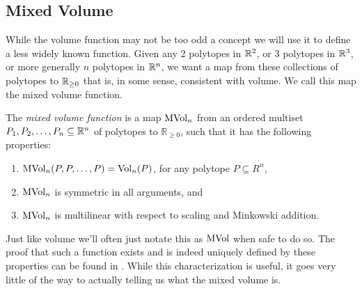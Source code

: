 \documentclass[12pt,oneside]{../../sfsuthesis}
\begin{document}
\subsection{Mixed Volume}
While the volume function may not be too odd a concept we will use it to define a less widely known function.
Given any \( 2 \) polytopes in \( \mathbb{R}^2 \), or \( 3 \) polytopes in \( \mathbb{R}^3 \), or more generally \( n \) polytopes in \( \mathbb{R}^n \), we want a map from these collections of polytopes to \( \mathbb{R}_{\geq 0} \) that is, in some sense, consistent with volume.
We call this map the mixed volume function.
\begin{definition}\th\label{def:mixedVolume}
    The \emph{mixed volume function} is a map \( \operatorname{MVol}_n \) from an ordered multiset \( P_1, P_2, \dots, P_n \subseteq \mathbb{R}^n \) of polytopes to \( \mathbb{R}_{\geq 0} \), such that it has the following properties:
    \begin{enumerate}
        \item \( \operatorname{MVol}_n(P, P, \dots, P) = \operatorname{Vol}_n(P) \), for any polytope \( P \subseteq R^n \),
        \item \( \operatorname{MVol}_n \) is symmetric in all arguments, and
        \item \( \operatorname{MVol}_n \) is multilinear with respect to scaling and Minkowski addition.
    \end{enumerate}
\end{definition}
Just like volume we'll often just notate this as \( \operatorname{MVol} \) when safe to do so.
The proof that such a function exists and is indeed uniquely defined by these properties can be found in \cite{schneiderConvexBodiesBrunn2013}.
While this characterization is useful, it goes very little of the way to actually telling us what the mixed volume is.
\end{document}
